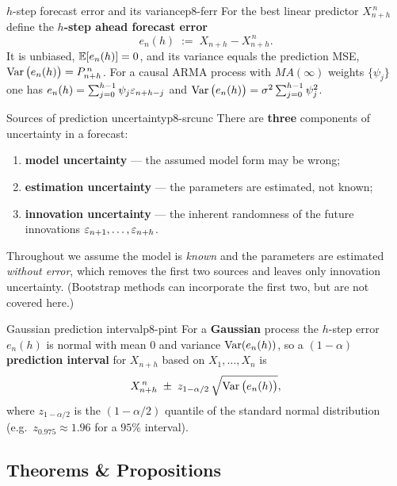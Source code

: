 \begin{definition}{$h$-step forecast error and its variance}{p8-ferr}
For the best linear predictor $X^{\,n}_{n+h}$ define the \textbf{$h$-step ahead
forecast error}
\[
e_n(h)\;:=\;X_{n+h}-X^{\,n}_{n+h}.
\]
It is unbiased, $\mathbb{E}[e_n(h)]=0$, and its variance equals the prediction MSE,
$\operatorname{Var}\big(e_n(h)\big)=P^{\,n}_{n+h}$. For a causal ARMA process with
$MA(\infty)$ weights $\{\psi_j\}$ one has
$e_n(h)=\sum_{j=0}^{h-1}\psi_j\varepsilon_{n+h-j}$ and
$\operatorname{Var}\big(e_n(h)\big)=\sigma^2\sum_{j=0}^{h-1}\psi_j^2$.
\end{definition}

\begin{definition}{Sources of prediction uncertainty}{p8-srcunc}
There are \textbf{three} components of uncertainty in a forecast:
\begin{enumerate}
  \item \textbf{model uncertainty} --- the assumed model form may be wrong;
  \item \textbf{estimation uncertainty} --- the parameters are estimated, not known;
  \item \textbf{innovation uncertainty} --- the inherent randomness of the future
        innovations $\varepsilon_{n+1},\dots,\varepsilon_{n+h}$.
\end{enumerate}
Throughout we assume the model is \emph{known} and the parameters are estimated
\emph{without error}, which removes the first two sources and leaves only
innovation uncertainty. (Bootstrap methods can incorporate the first two, but
are not covered here.)
\end{definition}

\begin{definition}{Gaussian prediction interval}{p8-pint}
For a \textbf{Gaussian} process the $h$-step error $e_n(h)$ is normal with mean
$0$ and variance $\operatorname{Var}(e_n(h))$, so a $(1-\alpha)$ \textbf{prediction interval}
for $X_{n+h}$ based on $X_1,\dots,X_n$ is
\[
X^{\,n}_{n+h}\;\pm\;z_{1-\alpha/2}\,\sqrt{\operatorname{Var}\big(e_n(h)\big)},
\]
where $z_{1-\alpha/2}$ is the $(1-\alpha/2)$ quantile of the standard normal
distribution (e.g.\ $z_{0.975}\approx1.96$ for a $95\%$ interval).
\end{definition}

\subsection{Theorems \& Propositions}

